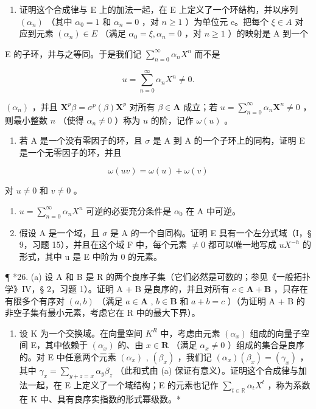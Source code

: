 \begin{enumerate}
\def\labelenumi{(\alph{enumi})}
\tightlist
\item
  证明这个合成律与 E 上的加法一起，在 E 上定义了一个环结构，并以序列 \((\alpha_{n})\) （其中 \(\alpha_{0}=1\) 和 \(\alpha_{n}=0\) ，对 \(n\geqslant1\) ）为单位元 e。把每个 \(\xi\in A\) 对应到元素 \((\alpha_{n})\in E\) （满足 \(\alpha_{0}=\xi,\alpha_{n}=0\) ，对 \(n\geqslant1\) ）的映射是 A 到一个
\end{enumerate}

E 的子环，并与之等同。于是我们记 \(\sum_{n=0}^{\infty} \alpha_n X^n\) 而不是

\[
u = \sum_ {n = 0} ^ {\infty} \alpha_ {n} X ^ {n} \neq 0.
\]

\((\alpha_{n})\) ，并且 \(\mathbf{X}^{p}\beta = \sigma^{p}(\beta)\mathbf{X}^{p}\) 对所有 \(\beta \in \mathbf{A}\) 成立；若 \(u = \sum_{n=0}^{\infty} \alpha_{n}\mathbf{X}^{n} \neq 0\) ，则最小整数 \(n\) （使得 \(\alpha_{n} \neq 0\) ）称为 \(u\) 的阶，记作 \(\omega(u)\) 。

\begin{enumerate}
\def\labelenumi{(\alph{enumi})}
\setcounter{enumi}{1}
\tightlist
\item
  若 A 是一个没有零因子的环，且 \(\sigma\) 是 A 到 A 的一个子环上的同构，证明 E 是一个无零因子的环，并且
\end{enumerate}

\[
\omega (u v) = \omega (u) + \omega (v)
\]

对 \(u \neq 0\) 和 \(v \neq 0\) 。

\begin{enumerate}
\def\labelenumi{(\alph{enumi})}
\setcounter{enumi}{2}
\item
  \(u = \sum_{n=0}^{\infty} \alpha_n X^n\) 可逆的必要充分条件是 \(\alpha_0\) 在 A 中可逆。
\item
  假设 A 是一个域，且 \(\sigma\) 是 A 的一个自同构。证明 E 具有一个左分式域（I，§ 9，习题 15），并且在这个域 F 中，每个元素 \(\neq0\) 都可以唯一地写成 \(uX^{-h}\) 的形式，其中 u 是 E 中阶为 0 的元素。
\end{enumerate}

¶ *26. (a) 设 A 和 B 是 R 的两个良序子集（它们必然是可数的；参见《一般拓扑学》IV，§ 2，习题 1）。证明 A + B 是良序的，并且对所有 \(c \in \mathbf{A} + \mathbf{B}\) ，只存在有限多个有序对 \((a, b)\) （满足 \(a \in \mathbf{A}\) , \(b \in \mathbf{B}\) 和 \(a + b = c\) ）（为证明 A + B 的非空子集有最小元素，考虑它在 R 中的最大下界）。

\begin{enumerate}
\def\labelenumi{(\alph{enumi})}
\setcounter{enumi}{1}
\tightlist
\item
  设 K 为一个交换域。在向量空间 \(K^{R}\) 中，考虑由元素 \((\alpha_{x})\) 组成的向量子空间 E，其中依赖于 \((\alpha_{x})\) 的、由 \(x \in \mathbf{R}\) （满足 \(\alpha_{x} \neq 0\) ）组成的集合是良序的。对 E 中任意两个元素 \((\alpha_{x})\) , \((\beta_{x})\) ，我们记 \((\alpha_{x})(\beta_{x}) = (\gamma_{x})\) ，其中 \(\gamma_{x} = \sum_{y+z=x} \alpha_{y} \beta_{z}\) （此和式由 (a) 保证有意义）。证明这个合成律与加法一起，在 E 上定义了一个域结构；E 的元素也记作 \(\sum_{t \in \mathbb{R}} \alpha_{t} X^{t}\) ，称为系数在 K 中、具有良序实指数的形式幂级数。*
\end{enumerate}

